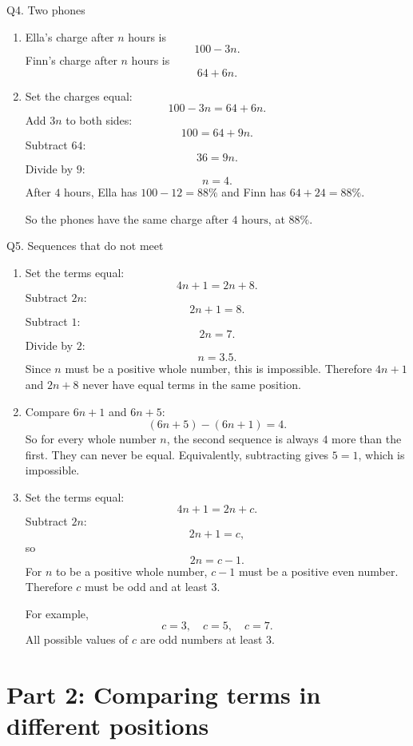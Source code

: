 \documentclass[11pt,a4paper]{article}
\begin{document}
\begin{solbox}{Q4. Two phones}
\begin{enumerate}[label=(\alph*)]
\item Ella's charge after \(n\) hours is
\[
100-3n.
\]
Finn's charge after \(n\) hours is
\[
64+6n.
\]
\item Set the charges equal:
\[
100-3n=64+6n.
\]
Add \(3n\) to both sides:
\[
100=64+9n.
\]
Subtract \(64\):
\[
36=9n.
\]
Divide by \(9\):
\[
n=4.
\]
After \(4\) hours, Ella has \(100-12=88\%\) and Finn has \(64+24=88\%\).

So the phones have the same charge after \(\boxed{4\text{ hours}}\), at \(\boxed{88\%}\).
\end{enumerate}
\end{solbox}

\begin{solbox}{Q5. Sequences that do not meet}
\begin{enumerate}[label=(\alph*)]
\item Set the terms equal:
\[
4n+1=2n+8.
\]
Subtract \(2n\):
\[
2n+1=8.
\]
Subtract \(1\):
\[
2n=7.
\]
Divide by \(2\):
\[
n=3.5.
\]
Since \(n\) must be a positive whole number, this is impossible. Therefore \(4n+1\) and \(2n+8\) never have equal terms in the same position.

\item Compare \(6n+1\) and \(6n+5\):
\[
(6n+5)-(6n+1)=4.
\]
So for every whole number \(n\), the second sequence is always \(4\) more than the first. They can never be equal. Equivalently, subtracting gives \(5=1\), which is impossible.

\item Set the terms equal:
\[
4n+1=2n+c.
\]
Subtract \(2n\):
\[
2n+1=c,
\]
so
\[
2n=c-1.
\]
For \(n\) to be a positive whole number, \(c-1\) must be a positive even number. Therefore \(c\) must be odd and at least \(3\).

For example,
\[
c=3,\quad c=5,\quad c=7.
\]
All possible values of \(c\) are odd numbers at least \(3\).
\end{enumerate}
\end{solbox}

\section*{Part 2: Comparing terms in different positions}
\end{document}
